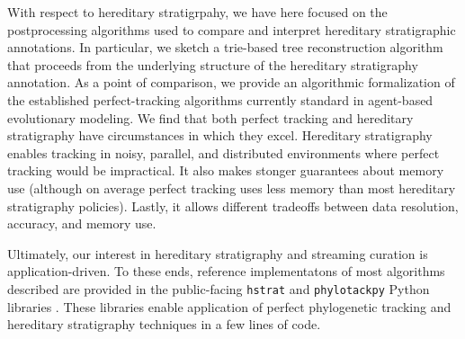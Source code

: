 With respect to hereditary stratigrpahy, we have here focused on the postprocessing algorithms used to compare and interpret hereditary stratigraphic annotations.
In particular, we sketch a trie-based tree reconstruction algorithm that proceeds from the underlying structure of the hereditary stratigraphy annotation.
As a point of comparison, we provide an algorithmic formalization of the established perfect-tracking algorithms currently standard in agent-based evolutionary modeling.
We find that both perfect tracking and hereditary stratigraphy have circumstances in which they excel.
Hereditary stratigraphy enables tracking in noisy, parallel, and distributed environments where perfect tracking would be impractical.
It also makes stonger guarantees about memory use (although on average perfect tracking uses less memory than most hereditary stratigraphy policies).
Lastly, it allows different tradeoffs between data resolution, accuracy, and memory use.


Ultimately, our interest in hereditary stratigraphy and streaming curation is application-driven.
To these ends, reference implementatons of most algorithms described are provided in the public-facing \texttt{hstrat} and \texttt{phylotackpy} Python libraries \citep{moreno2022hstrat, dolson2023phylotrackpy}.
These libraries enable application of perfect phylogenetic tracking and hereditary stratigraphy techniques in a few lines of code.
